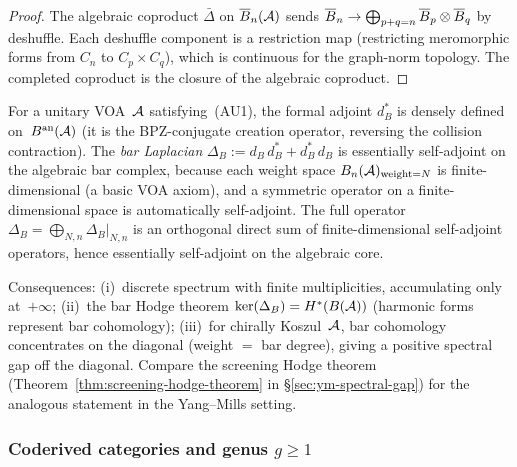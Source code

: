 \begin{proof}
The algebraic coproduct $\bar{\Delta}$ on $\overline{B}_n(\mathcal{A})$
sends $\overline{B}_n \to \bigoplus_{p+q=n} \overline{B}_p \otimes \overline{B}_q$
by deshuffle. Each deshuffle component is a restriction map
(restricting meromorphic forms from $C_n$ to
$C_p \times C_q$), which is continuous for the graph-norm
topology. The completed coproduct is the closure of the
algebraic coproduct.
\end{proof}

\begin{remark}%
\label{rem:bar-laplacian-hodge}%
%
For a unitary VOA~$\mathcal{A}$ satisfying~(AU1), the formal adjoint
$d_B^*$ is densely defined on~$B^{\mathrm{an}}(\mathcal{A})$
(it is the BPZ-conjugate creation operator, reversing the
collision contraction). The \emph{bar Laplacian}
$\Delta_B := d_B\,d_B^* + d_B^*\,d_B$
is essentially self-adjoint on the algebraic bar complex, because
each weight space $B_n(\mathcal{A})_{\mathrm{weight}=N}$ is
finite-dimensional (a basic VOA axiom), and a symmetric operator
on a finite-dimensional space is automatically self-adjoint.
The full operator
$\Delta_B = \bigoplus_{N,n} \Delta_B|_{N,n}$
is an orthogonal direct sum of finite-dimensional self-adjoint
operators, hence essentially self-adjoint on the algebraic core.

Consequences: (i)~discrete spectrum with finite multiplicities,
accumulating only at~$+\infty$;
(ii)~the bar Hodge theorem
$\ker(\Delta_B) = H^*(B(\mathcal{A}))$
(harmonic forms represent bar cohomology);
(iii)~for chirally Koszul~$\mathcal{A}$, bar cohomology concentrates on
the diagonal (weight $=$ bar degree), giving a positive spectral
gap off the diagonal. Compare the screening Hodge theorem
(Theorem~\ref{thm:screening-hodge-theorem} in
\S\ref{sec:ym-spectral-gap}) for the analogous statement in the
Yang--Mills setting.
\end{remark}

\subsubsection{Coderived categories and genus $g \geq 1$}

